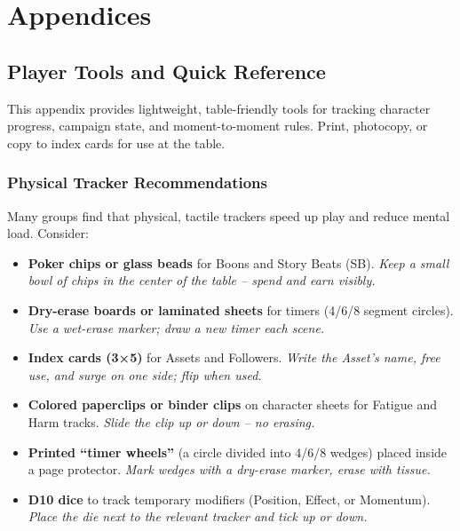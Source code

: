 \chapter{Appendices}


\section{Player Tools and Quick Reference}
\label{app:player-tools}

This appendix provides lightweight, table-friendly tools for tracking character progress, campaign state, and moment-to-moment rules. Print, photocopy, or copy to index cards for use at the table.

\subsection{Physical Tracker Recommendations}

Many groups find that physical, tactile trackers speed up play and reduce mental load. Consider:

\begin{itemize}
  \item \textbf{Poker chips or glass beads} for Boons and Story Beats (SB).  
  \emph{Keep a small bowl of chips in the center of the table -- spend and earn visibly.}
  \item \textbf{Dry-erase boards or laminated sheets} for timers (4/6/8 segment circles).  
  \emph{Use a wet-erase marker; draw a new timer each scene.}
  \item \textbf{Index cards (3×5)} for Assets and Followers.  
  \emph{Write the Asset's name, free use, and surge on one side; flip when used.}
  \item \textbf{Colored paperclips or binder clips} on character sheets for Fatigue and Harm tracks.  
  \emph{Slide the clip up or down -- no erasing.}
  \item \textbf{Printed ``timer wheels''} (a circle divided into 4/6/8 wedges) placed inside a page protector.  
  \emph{Mark wedges with a dry-erase marker, erase with tissue.}
  \item \textbf{D10 dice} to track temporary modifiers (Position, Effect, or Momentum).  
  \emph{Place the die next to the relevant tracker and tick up or down.}
\end{itemize}

